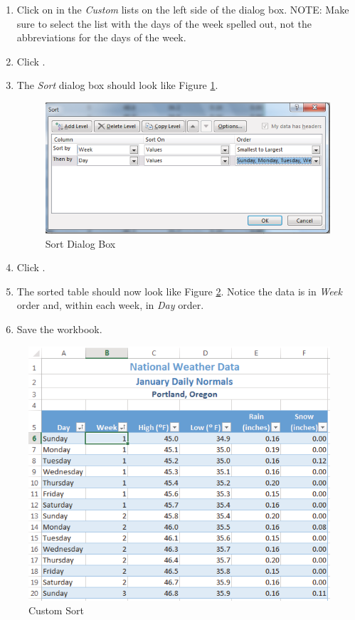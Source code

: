 \begin{enumbox}
\begin{enumerate}
		\item Click on  in the \textit{Custom} lists on the left side of the dialog box. NOTE: Make sure to select the list with the days of the week spelled out, not the abbreviations for the days of the week.
		\item Click . 
		\item The \textit{Sort} dialog box should look like Figure \ref{05:fig14}.

		\begin{figure}[H]
			\centering
			\includegraphics[width=\maxwidth{.95\linewidth}]{gfx/ch05_fig14}
			\caption{Sort Dialog Box}
			\label{05:fig14}
		\end{figure}

		\item Click .
		\item The sorted table should now look like Figure \ref{05:fig15}. Notice the data is in \textit{Week} order and, within each week, in \textit{Day} order.
		\item Save the  workbook.
	\end{enumerate}
\end{enumbox}
	
\begin{figure}[H]
	\centering
	\includegraphics[width=\maxwidth{.95\linewidth}]{gfx/ch05_fig15}
	\caption{Custom Sort}
	\label{05:fig15}
\end{figure}

